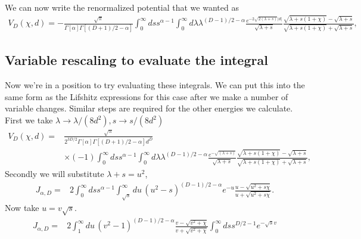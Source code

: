We can now write the renormalized potential that we wanted as 
\begin{align}
V_D(\chi,d)=-\frac{\sqrt{\pi}}{\Gamma[\alpha]\Gamma\left[(D+1)/2-\alpha\right]}\int_0^\infty ds s^{\alpha-1}\int_0^\infty d\lambda \lambda^{(D-1)/2-\alpha}\frac{e^{-2\sqrt{2(\lambda+s)}|d|}}{\sqrt{\lambda+s}} \frac{\sqrt{\lambda+s(1+\chi)}-\sqrt{\lambda+s}}{\sqrt{\lambda+s(1+\chi)}+\sqrt{\lambda+s}},
\end{align}

\subsection{Variable rescaling to evaluate the integral}
Now we're in a position to try evaluating these integrals.  We can put this into the same form as the Lifshitz expressions for this case after we make a number of variable changes.  Similar steps are required for the other energies we calculate.  
First we take $\lambda \rightarrow \lambda/(8d^2), s\rightarrow s/(8d^2)$
\begin{align}
V_D(\chi,d)%
=&\frac{\sqrt{\pi}}{2^{3D/2}\Gamma[\alpha]\Gamma\left[(D+1)/2-\alpha\right]d^D}\nonumber \\
&\times(-1)\int_0^\infty ds s^{\alpha-1}\int_0^\infty d\lambda \lambda^{(D-1)/2-\alpha}\frac{e^{-\sqrt{(\lambda+s)}}}{\sqrt{\lambda+s}} \frac{\sqrt{\lambda+s(1+\chi)}-\sqrt{\lambda+s}}{\sqrt{\lambda+s(1+\chi)}+\sqrt{\lambda+s}},
\end{align}
Secondly we will substitute $\lambda +s = u^2$,
\begin{align}
J_{\alpha,D} %
=& 2\int_0^\infty ds s^{\alpha-1}\int_{\sqrt{s}}^\infty du\, (u^2-s)^{(D-1)/2-\alpha}e^{-u} \frac{u-\sqrt{u^2+s\chi}}{u+\sqrt{u^2+s\chi  }}.
\end{align}
Now take $u = v\sqrt{s}$.  
\begin{align}
J_{\alpha,D} %
=& 2\int_{1}^\infty du\,(v^2-1)^{(D-1)/2-\alpha}\frac{v-\sqrt{v^2+\chi}}{v+\sqrt{v^2+\chi  }}\int_0^\infty ds s^{D/2-1}e^{-\sqrt{s}v}
\end{align}
